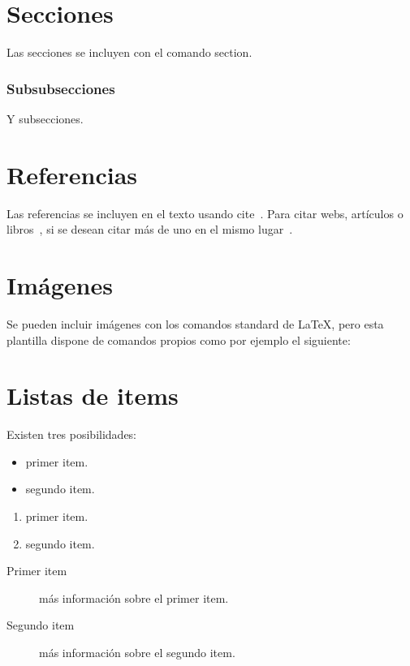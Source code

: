 \section{Secciones}

Las secciones se incluyen con el comando section.

\subsubsection{Subsubsecciones}

Y subsecciones. 


\section{Referencias}

Las referencias se incluyen en el texto usando cite~\cite{wiki:latex}. Para citar webs, artículos o libros~\cite{koza92}, si se desean citar más de uno en el mismo lugar~\cite{bortolot2005, koza92}.


\section{Imágenes}

Se pueden incluir imágenes con los comandos standard de \LaTeX, pero esta plantilla dispone de comandos propios como por ejemplo el siguiente:




\section{Listas de items}

Existen tres posibilidades:

\begin{itemize}
	\item primer item.
	\item segundo item.
\end{itemize}

\begin{enumerate}
	\item primer item.
	\item segundo item.
\end{enumerate}

\begin{description}
	\item[Primer item] más información sobre el primer item.
	\item[Segundo item] más información sobre el segundo item.
\end{description}
	
